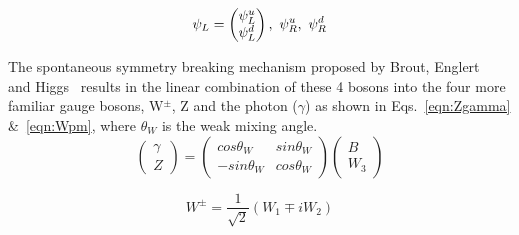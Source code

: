 \begin{equation*}
\psi_L = \begin{pmatrix} \psi^u_L \\ \psi^d_L \end{pmatrix},~\psi_R^u,~\psi_R^d
\end{equation*}

The spontaneous symmetry breaking mechanism proposed by Brout, Englert~\cite{PhysRevLett.13.321} and Higgs~\cite{PhysRevLett.13.508} results in the linear combination of these 4 bosons into the four more familiar gauge bosons, W$^{\pm}$, Z and the photon ($\gamma$) as shown in Eqs.~\ref{eqn:Zgamma} \&~\ref{eqn:Wpm}, where $\theta_{W}$ is the weak mixing angle.
\begin{equation}
\label{eqn:Zgamma}
\left( \begin{array}{c}
\gamma \\
Z \end{array} \right)
=
\left( \begin{array}{cc}
cos\theta_{W} & sin\theta_{W} \\
-sin\theta_{W} & cos\theta_{W} \end{array} \right)
\left( \begin{array}{c}
B \\
W_{3}\end{array} \right)
\end{equation}

\begin{equation}
\label{eqn:Wpm}
W^{\pm}=\frac{1}{\sqrt{2}}\left(W_{1}\mp iW_{2}\right)
\end{equation}




